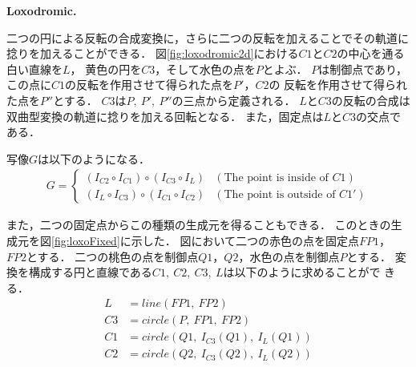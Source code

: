 \noindent\textbf{Loxodromic.}

二つの円による反転の合成変換に，さらに二つの反転を加えることでその軌道に
捻りを加えることができる．
図\ref{fig:loxodromic2d}における$C1$と$C2$の中心を通る白い直線を$L$，
黄色の円を$C3$，そして水色の点を$P$とよぶ．
$P$は制御点であり，この点に$C1$の反転を作用させて得られた点を$P'$，$C2$の
反転を作用させて得られた点を$P''$とする．
$C3$は$P,~P',~P''$の三点から定義される．
$L$と$C3$の反転の合成は双曲型変換の軌道に捻りを加える回転となる．
また，固定点は$L$と$C3$の交点である．

写像$G$は以下のようになる．
\begin{align*}
G =
\begin{cases}
 (I_{C2} \circ I_{C1}) \circ (I_{C3} \circ I_L) & (\text{The point is inside of } C1) \\
 (I_L \circ I_{C3}) \circ (I_{C1} \circ I_{C2}) & (\text{The point is outside of }C1')
\end{cases}
\end{align*}

また，二つの固定点からこの種類の生成元を得ることもできる．
このときの生成元を図\ref{fig:loxoFixed}に示した．
図において二つの赤色の点を固定点$FP1$，$FP2$とする．
二つの桃色の点を制御点$Q1$，$Q2$，水色の点を制御点$P$とする．
変換を構成する円と直線である$C1,~C2,~C3,~L$は以下のように求めることがで
きる．
\begin{align*}
 L &= line(FP1,~FP2)\\
 C3 &= circle(P,~FP1,~FP2)\\
 C1 &= circle(Q1,~I_{C3}(Q1),~I_{L}(Q1))\\
 C2 &= circle(Q2,~I_{C3}(Q2),~I_{L}(Q2))
\end{align*}

